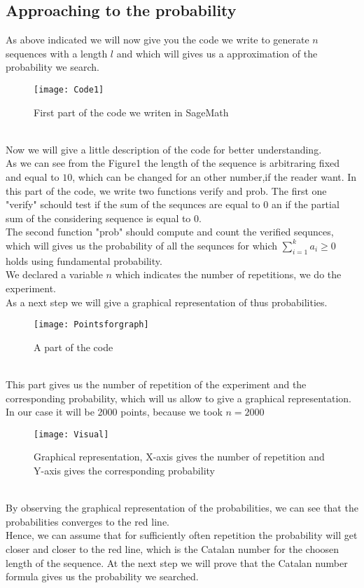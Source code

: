 \documentclass[a4paper,12pt,oneside]{article}
\begin{document}
\subsection{Approaching to the probability}
As above indicated we will now give you the code we write to generate $n$ sequences with a length $l$ and which will gives us a approximation of the probability we search.
\begin{figure}[h]
\centering
\texttt{[image: Code1]}
\caption{First part of the code we writen in SageMath }
\end{figure}
\\Now we will give a little description of the code for better understanding.\\As we can see from the Figure1 the length of the sequence is arbitraring fixed and equal to $10$, which can be changed for an other number,if the reader want.
In this part of the code, we write two functions verify and prob. The first one "verify" schould  test if the sum of the sequnces are equal  to $0$ an if the partial sum of the considering sequence is equal to $0$.\\ The second function "prob" should compute and count the verified sequnces, which will gives us the probability of all the sequnces for which $\sum_{i=1}^{k}a_{i}\geq0$ holds using fundamental probability.
\\We declared a variable $n$ which indicates the number of repetitions, we do the experiment.
\\As a next step we will give a graphical representation of thus probabilities.
\begin{figure}[h]
\centering
\texttt{[image: Pointsforgraph]}
\caption{A part of the code}
\end{figure}
\vspace{0.3cm}\\This part gives us the number of repetition of the experiment and the corresponding probability, which will us allow to give a graphical representation. In our case it will be 2000 points, because we took $n=2000$
\begin{figure}[h]
\centering
\texttt{[image: Visual]}
\caption{Graphical representation, X-axis gives the number of repetition and Y-axis gives the corresponding probability }
\end{figure}
\vspace{0.3cm}\\By observing the graphical representation of the probabilities, we can see that the probabilities converges to the red line.
\\Hence, we can assume that for sufficiently often repetition the probability will get closer and closer to the red line, which is the Catalan number for the choosen length of the sequence. At the next step we will prove that the Catalan number formula gives us the probability we searched.
\newpage
\end{document}
